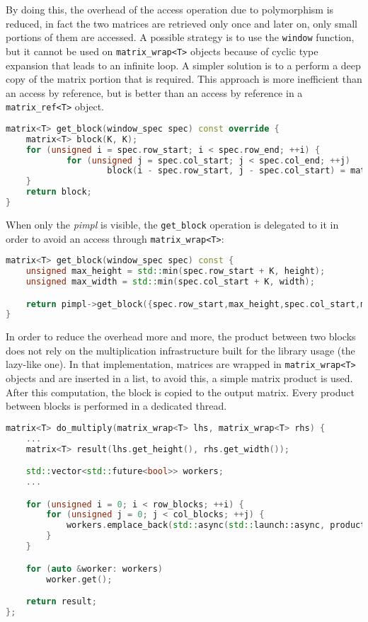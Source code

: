 \documentclass[10pt,a4paper]{article}
\begin{document}
By doing this, the overhead of the access operation due to polymorphism is reduced,
in fact the two matrices are retrieved only once and later on, only small portions of
them are accessed. A possible strategy is to use the \verb!window! function, but it
cannot be used on \verb!matrix_wrap<T>! objects because of cyclic type expansion
that leads to an infinite loop. A simpler solution is to a perform a deep copy of
the matrix portion that is required. This approach is more inefficient than an
access by reference, but is better than an access by reference in a
\verb!matrix_ref<T>! object.
\newpage
\begin{lstlisting}[language= C++]
matrix<T> get_block(window_spec spec) const override {
    matrix<T> block(K, K);
    for (unsigned i = spec.row_start; i < spec.row_end; ++i) {
            for (unsigned j = spec.col_start; j < spec.col_end; ++j)
                    block(i - spec.row_start, j - spec.col_start) = mat(i, j);
    }
    return block;
}
\end{lstlisting}
When only the \textit{pimpl} is visible, the \verb!get_block! operation is
delegated to it in order to avoid an access through \verb!matrix_wrap<T>!:
\begin{lstlisting}[language=C++]
matrix<T> get_block(window_spec spec) const {
    unsigned max_height = std::min(spec.row_start + K, height);
    unsigned max_width = std::min(spec.col_start + K, width);

    return pimpl->get_block({spec.row_start,max_height,spec.col_start,max_width});
}
\end{lstlisting}
In order to reduce the overhead more and more, the product between two blocks does
not rely on the multiplication infrastructure built for the library usage
(the lazy-like one). In that implementation, matrices are wrapped in
\verb!matrix_wrap<T>! objects and are inserted in a list, to avoid this, a simple
matrix product is used. After this computation, the block is copied to the output
matrix. Every product between blocks is performed in a dedicated thread.
\begin{lstlisting}[language=C++]
matrix<T> do_multiply(matrix_wrap<T> lhs, matrix_wrap<T> rhs) {
    ...
    matrix<T> result(lhs.get_height(), rhs.get_width());

    std::vector<std::future<bool>> workers;
    ...

    for (unsigned i = 0; i < row_blocks; ++i) {
        for (unsigned j = 0; j < col_blocks; ++j) {
            workers.emplace_back(std::async(std::launch::async, product, lhs, rhs, std::ref(result), i * K, j * K));
        }
    }

    for (auto &worker: workers)
        worker.get();

    return result;
};
\end{lstlisting}
\end{document}
